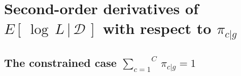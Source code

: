 

\section{Second-order derivatives of $E\!\left[\,\left.\log\,L\,\right\vert\,\mathcal{D}\,\right]$ with respect to $\pi_{c \vert g}$}
\setcounter{theorem}{0}
\setcounter{equation}{0}

\renewcommand{\theenumi}{\roman{enumi}}
\renewcommand{\labelenumi}{\textnormal{(\theenumi)}$\;\;$}


\subsection{The constrained case $\overset{C}{\underset{c=1}{\sum}}\,\pi_{c \vert g} = 1$}

